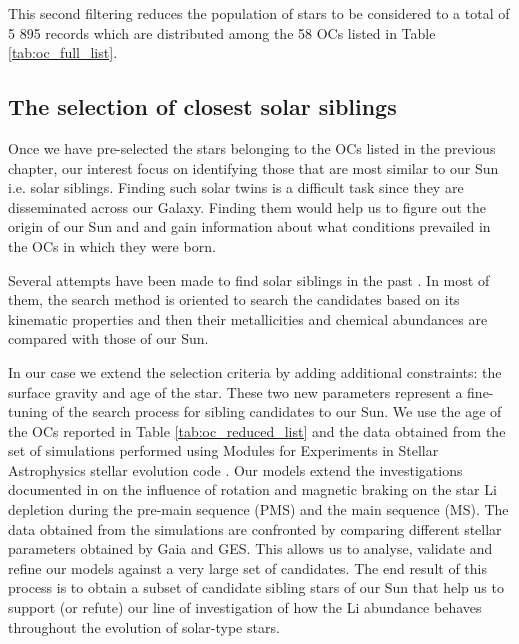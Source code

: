 \documentclass[fleqn,usenatbib]{mnras}
\begin{document}
This second filtering reduces the population of stars to be considered to a total of 5 895 records which are distributed among the 58 OCs listed in Table \ref{tab:oc_full_list}.\par

\subsection{The selection of closest solar siblings}
Once we have pre-selected the stars belonging to the OCs listed in the previous chapter, our interest focus on identifying those that are most similar to our Sun i.e. solar siblings. Finding such solar twins is a difficult task since they are disseminated across our Galaxy. Finding them would help us to figure out the origin of our Sun and and gain information about what conditions prevailed in the OCs in which they were born.\par

Several attempts have been made to find solar siblings in the past \citep[see][and references therein]{Adibekyan2018}. In most of them, the search method is oriented to search the candidates based on its kinematic properties and then their metallicities and chemical abundances are compared with those of our Sun.\par

In our case we extend the selection criteria by adding additional constraints: the surface gravity and age of the star. These two new parameters represent a fine-tuning of the search process for sibling candidates to our Sun. We use the age of the OCs reported in Table \ref{tab:oc_reduced_list} and the data obtained from the set of simulations performed using Modules for Experiments in Stellar Astrophysics stellar evolution code \citep[MESA; ][]{Paxton2011, Paxton2013,Paxton2015, Paxton2018, Paxton2019}. Our models extend the investigations documented in \cite{Navarro2020} on the influence of rotation and magnetic braking on the star Li depletion during the pre-main sequence (PMS) and the main sequence (MS). The data obtained from the simulations are confronted by comparing different stellar parameters obtained by Gaia and GES. This allows us to analyse, validate and refine our models against a very large set of candidates. The end result of this process is to obtain a subset of candidate sibling stars of our Sun that help us to support (or refute) our line of investigation of how the Li abundance behaves throughout the evolution of solar-type stars.\par
\end{document}
